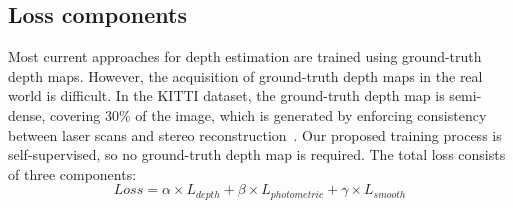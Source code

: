 \documentclass[letterpaper, 10 pt, conference]{ieeeconf}
\begin{document}
\subsection{Loss components}
    Most current approaches for depth estimation are trained using ground-truth depth maps. However, the acquisition of ground-truth depth maps in the real world is difficult. In the KITTI dataset, the ground-truth depth map is semi-dense, covering 30\% of the image, which is generated by enforcing consistency between laser scans and stereo reconstruction~\cite{sparsityCNN}. Our proposed training process is self-supervised, so no ground-truth depth map is required. The total loss consists of three components:
    \begin{equation}
    Loss = \alpha \times L_{depth} + \beta \times L_{photometric} + \gamma \times L_{smooth}
    \end{equation}
\end{document}
